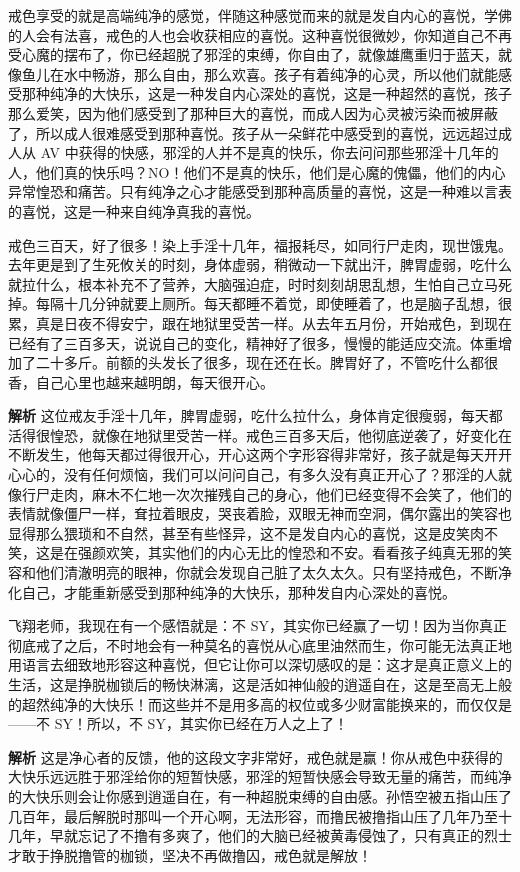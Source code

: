戒色享受的就是高端纯净的感觉，伴随这种感觉而来的就是发自内心的喜悦，学佛的人会有法喜，戒色的人也会收获相应的喜悦。这种喜悦很微妙，你知道自己不再受心魔的摆布了，你已经超脱了邪淫的束缚，你自由了，就像雄鹰重归于蓝天，就像鱼儿在水中畅游，那么自由，那么欢喜。孩子有着纯净的心灵，所以他们就能感受那种纯净的大快乐，这是一种发自内心深处的喜悦，这是一种超然的喜悦，孩子那么爱笑，因为他们感受到了那种巨大的喜悦，而成人因为心灵被污染而被屏蔽了，所以成人很难感受到那种喜悦。孩子从一朵鲜花中感受到的喜悦，远远超过成人从 AV 中获得的快感，邪淫的人并不是真的快乐，你去问问那些邪淫十几年的人，他们真的快乐吗？NO！他们不是真的快乐，他们是心魔的傀儡，他们的内心异常惶恐和痛苦。只有纯净之心才能感受到那种高质量的喜悦，这是一种难以言表的喜悦，这是一种来自纯净真我的喜悦。

\begin{case}
    戒色三百天，好了很多！染上手淫十几年，福报耗尽，如同行尸走肉，现世饿鬼。去年更是到了生死攸关的时刻，身体虚弱，稍微动一下就出汗，脾胃虚弱，吃什么就拉什么，根本补充不了营养，大脑强迫症，时时刻刻胡思乱想，生怕自己立马死掉。每隔十几分钟就要上厕所。每天都睡不着觉，即使睡着了，也是脑子乱想，很累，真是日夜不得安宁，跟在地狱里受苦一样。从去年五月份，开始戒色，到现在已经有了三百多天，说说自己的变化，精神好了很多，慢慢的能适应交流。体重增加了二十多斤。前额的头发长了很多，现在还在长。脾胃好了，不管吃什么都很香，自己心里也越来越明朗，每天很开心。

    \textbf{解析} 这位戒友手淫十几年，脾胃虚弱，吃什么拉什么，身体肯定很瘦弱，每天都活得很惶恐，就像在地狱里受苦一样。戒色三百多天后，他彻底逆袭了，好变化在不断发生，他每天都过得很开心，开心这两个字形容得非常好，孩子就是每天开开心心的，没有任何烦恼，我们可以问问自己，有多久没有真正开心了？邪淫的人就像行尸走肉，麻木不仁地一次次摧残自己的身心，他们已经变得不会笑了，他们的表情就像僵尸一样，耷拉着眼皮，哭丧着脸，双眼无神而空洞，偶尔露出的笑容也显得那么猥琐和不自然，甚至有些怪异，这不是发自内心的喜悦，这是皮笑肉不笑，这是在强颜欢笑，其实他们的内心无比的惶恐和不安。看看孩子纯真无邪的笑容和他们清澈明亮的眼神，你就会发现自己脏了太久太久。只有坚持戒色，不断净化自己，才能重新感受到那种纯净的大快乐，那种发自内心深处的喜悦。
\end{case}

\begin{case}
    飞翔老师，我现在有一个感悟就是：不 SY，其实你已经赢了一切！因为当你真正彻底戒了之后，不时地会有一种莫名的喜悦从心底里油然而生，你可能无法真正地用语言去细致地形容这种喜悦，但它让你可以深切感叹的是：这才是真正意义上的生活，这是挣脱枷锁后的畅快淋漓，这是活如神仙般的逍遥自在，这是至高无上般的超然纯净的大快乐！而这些并不是用多高的权位或多少财富能换来的，而仅仅是——不 SY！所以，不 SY，其实你已经在万人之上了！

    \textbf{解析} 这是净心者的反馈，他的这段文字非常好，戒色就是赢！你从戒色中获得的大快乐远远胜于邪淫给你的短暂快感，邪淫的短暂快感会导致无量的痛苦，而纯净的大快乐则会让你感到逍遥自在，有一种超脱束缚的自由感。孙悟空被五指山压了几百年，最后解脱时那叫一个开心啊，无法形容，而撸民被撸指山压了几年乃至十几年，早就忘记了不撸有多爽了，他们的大脑已经被黄毒侵蚀了，只有真正的烈士才敢于挣脱撸管的枷锁，坚决不再做撸囚，戒色就是解放！
\end{case}

